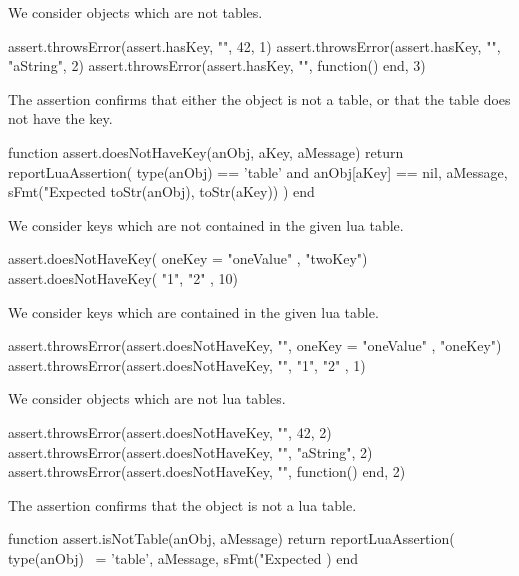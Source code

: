 
We consider objects which are not tables.

\startLuaTest
  assert.throwsError(assert.hasKey, "", 42, 1)
  assert.throwsError(assert.hasKey, "", "aString", 2)
  assert.throwsError(assert.hasKey, "", function() end, 3)
\stopLuaTest
\stopTestCase

\stopTestSuite


The  assertion confirms that either the object 
is not a table, or that the table does not have the key. 

\startLuaCode
function assert.doesNotHaveKey(anObj, aKey, aMessage)
  return reportLuaAssertion(
    type(anObj) == 'table' and anObj[aKey] == nil,
    aMessage,
    sFmt("Expected %
      toStr(anObj), toStr(aKey))
  )
end
\stopLuaCode


We consider keys which are not contained in the given lua table.

\startLuaTest
  assert.doesNotHaveKey({ oneKey = "oneValue" }, "twoKey")
  assert.doesNotHaveKey({ "1", "2" }, 10)
\stopLuaTest
\stopTestCase


We consider keys which are contained in the given lua table.

\startLuaTest
  assert.throwsError(assert.doesNotHaveKey, "",
    { oneKey = "oneValue" }, "oneKey")
  assert.throwsError(assert.doesNotHaveKey, "",
    { "1", "2" }, 1)
\stopLuaTest
\stopTestCase


We consider objects which are not lua tables.

\startLuaTest
  assert.throwsError(assert.doesNotHaveKey, "", 42, 2)
  assert.throwsError(assert.doesNotHaveKey, "", "aString", 2)
  assert.throwsError(assert.doesNotHaveKey, "",
    function() end, 2)
\stopLuaTest
\stopTestCase

\stopTestSuite


The  assertion confirms that the object is not a 
lua table. 

\startLuaCode
function assert.isNotTable(anObj, aMessage)
  return reportLuaAssertion(
    type(anObj) ~= 'table',
    aMessage,
    sFmt("Expected %
  )
end
\stopLuaCode

